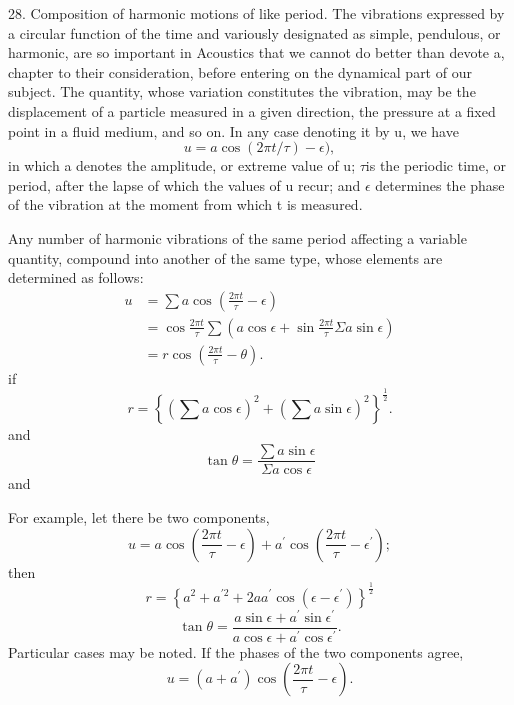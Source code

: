 28.  Composition of harmonic motions of like period.  The vibrations expressed
by a circular function of the time and variously designated as simple,
pendulous, or harmonic, are so important in Acoustics that we cannot do better
than devote a, chapter to their consideration, before entering on the dynamical
part of our subject. The quantity, whose variation constitutes the vibration,
may be the displacement of a particle measured in a given direction, the
pressure at a fixed point in a fluid medium, and so on.  In any case denoting
it by u, we have
\begin{equation*} u =a \cos(2 \pi t/ \tau ) - \epsilon ), \tag{1}
\end{equation*}
in which a denotes the amplitude, or extreme value of
u; \(\tau\)is the periodic time, or period, after the lapse of which the values
of u recur; and \(\epsilon\) determines the phase of the vibration at the
moment from which t is measured.

Any number of harmonic vibrations of the same period affecting a variable
quantity, compound into another of the same type, whose elements are determined
as follows:
\begin{align*}
u & =\sum a \cos \left(\frac{2 \pi t}{\tau}-\epsilon\right) \\
& =\cos \frac{2 \pi t}{\tau}
\sum \left( a \cos \epsilon+\sin \frac{2 \pi t}{\tau} \Sigma a \sin \epsilon \right) \\
& =r \cos \left(\frac{2 \pi t}{\tau}-\theta\right) \tag{2}.
\end{align*}
if
\begin{equation*} r=\left\{\left(\sum a \cos \epsilon\right)^2+\left(\sum a
\sin \epsilon\right)^2\right\}^{\frac{1}{2}} . \tag{3}
\end{equation*}
and
\begin{equation*} \tan \theta=\frac{ \sum a \sin \epsilon }{\Sigma a \cos
\epsilon} \tag{4}
\end{equation*}
and

For example, let there be two components,
\[
u=a \cos \left(\frac{2 \pi t}{\tau}-\epsilon\right)+
a^{\prime} \cos \left(\frac{2 \pi t}{\tau}-\epsilon^{\prime}\right);
\]
then
\begin{equation*}
r=\left\{a^2+a^{\prime 2}+2 a a^{\prime} \cos
\left(\epsilon-\epsilon^{\prime}\right)\right\}^{\frac{1}{2}} \tag{5}
\end{equation*}
\begin{equation*} \tan \theta= \frac{a \sin \epsilon+a^{\prime}
\sin \epsilon^{\prime}}{a \cos \epsilon+a^{\prime} \cos \epsilon^{\prime}} \tag{6}.
\end{equation*}
Particular cases may be noted. If the phases of the two components agree,
\[u=\left(a+a^{\prime}\right) \cos \left(\frac{2 \pi t}{\tau}-\epsilon\right) .\]

